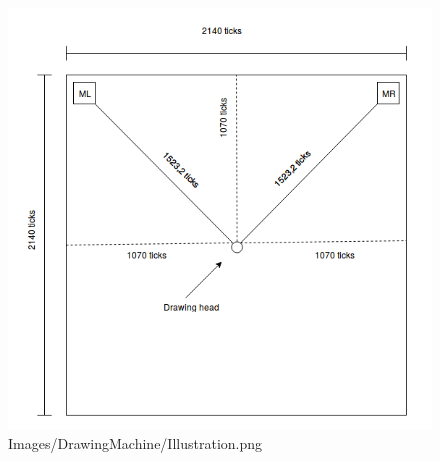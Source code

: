 \begin{figure}[H]
\includegraphics[width=\textwidth]{Images/DrawingMachine/Illustration.png}
\caption{Images/DrawingMachine/Illustration.png}
\label{fig:Images/DrawingMachine/Illustration.png}
\end{figure}
